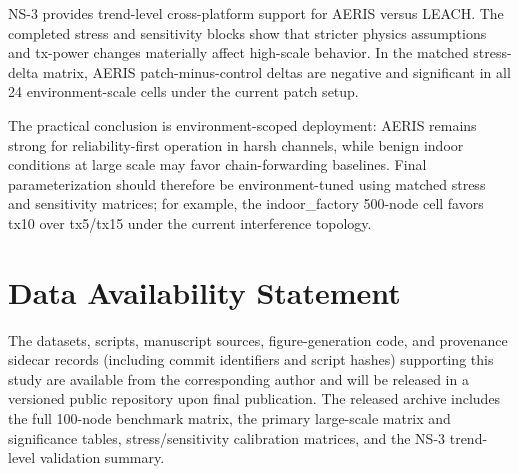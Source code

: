 ﻿\documentclass[sensors,article,submit,moreauthors,pdftex]{Definitions/mdpi}
\begin{document}
NS-3 provides trend-level cross-platform support for AERIS versus LEACH. The completed stress and sensitivity blocks show that stricter physics assumptions and tx-power changes materially affect high-scale behavior. In the matched stress-delta matrix, AERIS patch-minus-control deltas are negative and significant in all 24 environment-scale cells under the current patch setup.

The practical conclusion is environment-scoped deployment: AERIS remains strong for reliability-first operation in harsh channels, while benign indoor conditions at large scale may favor chain-forwarding baselines. Final parameterization should therefore be environment-tuned using matched stress and sensitivity matrices; for example, the indoor\_factory 500-node cell favors tx10 over tx5/tx15 under the current interference topology.

\section*{Data Availability Statement}
The datasets, scripts, manuscript sources, figure-generation code, and provenance sidecar records (including commit identifiers and script hashes) supporting this study are available from the corresponding author and will be released in a versioned public repository upon final publication. The released archive includes the full 100-node benchmark matrix, the primary large-scale matrix and significance tables, stress/sensitivity calibration matrices, and the NS-3 trend-level validation summary.


\end{document}
